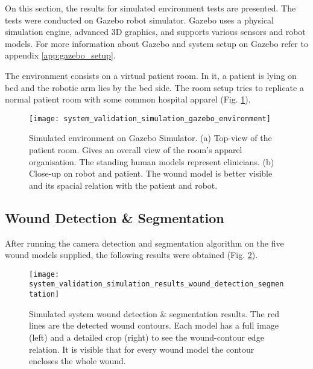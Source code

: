 On this section, the results for simulated environment tests are presented. The tests were conducted on Gazebo robot simulator. Gazebo uses a physical simulation engine, advanced 3D graphics, and supports various sensors and robot models. For more information about Gazebo and system setup on Gazebo refer to appendix \ref{app:gazebo_setup}.

The environment consists on a virtual patient room. In it, a patient is lying on bed and the robotic arm lies by the bed side. The room setup tries to replicate a normal patient room with some common hospital apparel (Fig. \ref{fig:system_validation_simulation_gazebo_environment}).

\begin{figure}[htbp]
	\centering
	\texttt{[image: system\_validation\_simulation\_gazebo\_environment]}
	\caption[Simulated environment on Gazebo Simulator.]{Simulated environment on Gazebo Simulator. (a) Top-view of the patient room. Gives an overall view of the room's apparel organisation. The standing human models represent clinicians. (b) Close-up on robot and patient. The wound model is better visible and its spacial relation with the patient and robot.}
	\label{fig:system_validation_simulation_gazebo_environment}
\end{figure}

\subsection{Wound Detection \& Segmentation}
\label{subsec:simulated_system_results_wound_detection_segmentation}

After running the camera detection and segmentation algorithm on the five wound models supplied, the following results were obtained (Fig. \ref{fig:system_validation_simulation_results_wound_detection_segmentation}).\\

\begin{figure}[htbp]
	\centering
	\texttt{[image: system\_validation\_simulation\_results\_wound\_detection\_segmentation]}
	\caption[Simulated system wound detection \& segmentation results.]{Simulated system wound detection \& segmentation results. The red lines are the detected wound contours. Each model has a full image (left) and a detailed crop (right) to see the wound-contour edge relation. It is visible that for every wound model the contour encloses the whole wound.}
	\label{fig:system_validation_simulation_results_wound_detection_segmentation}
\end{figure}

